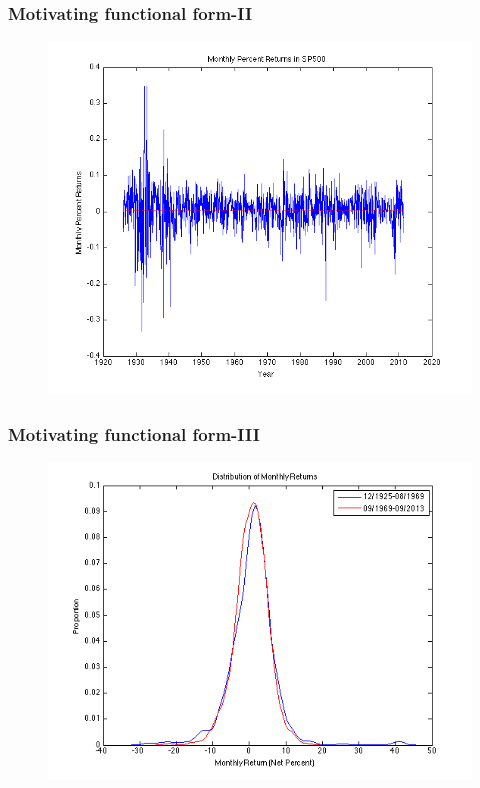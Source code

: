 \documentclass{beamer}
\begin{document}
\begin{frame}
\frametitle[alignment=center]{Motivating functional form-II}
\begin{figure}
\centering
\includegraphics[scale=0.4]{Sp500MonthlyReturns}
\end{figure}
\end{frame}

\begin{frame}
\frametitle[alignment=center]{Motivating functional form-III}
\begin{figure}
\centering
\includegraphics[scale=0.5]{DistributionofReturns}
\end{figure}
\end{frame}
\end{document}
